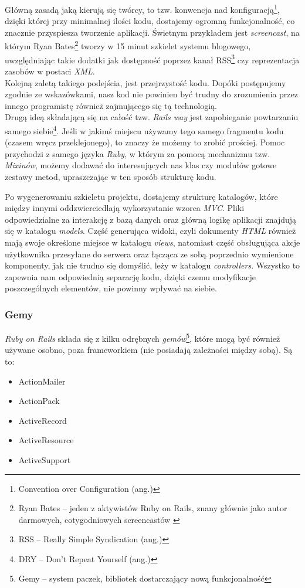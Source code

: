 \documentclass[a4paper,12pt]{article}
\begin{document}
Główną zasadą jaką kierują się twórcy, to tzw. konwencja nad
konfiguracją\footnote{Convention over Configuration (ang.)}, dzięki której przy minimalnej
ilości kodu, dostajemy ogromną funkcjonalność, co znacznie przyspiesza tworzenie
aplikacji. Świetnym przykładem jest \emph{screencast}, na którym Ryan
Bates\footnote{Ryan Bates -- jeden z aktywistów Ruby on Rails, znany głównie jako autor
darmowych, cotygodniowych screencastów \cite{ryan-bates}} tworzy w 15 minut szkielet
systemu blogowego, uwzględniając takie dodatki jak dostępność poprzez kanał
RSS\footnote{RSS -- Really Simple Syndication (ang.)} czy reprezentacja zasobów w postaci
\emph{XML}.\cite{blog-in-15-min}\\
Kolejną zaletą takiego podejścia, jest przejrzystość kodu. Dopóki postępujemy zgodnie ze
wskazówkami, nasz kod nie powinien być trudny do zrozumienia przez innego programistę
również zajmującego się tą technologią.\\
Drugą ideą składającą się na całość tzw. \emph{Rails way} jest zapobieganie powtarzaniu
samego siebie\footnote{DRY -- Don't Repeat Yourself (ang.)}. Jeśli w jakimś miejscu używamy
tego samego fragmentu kodu (czasem wręcz przeklejonego), to znaczy że możemy to zrobić
prościej. Pomoc przychodzi z samego języka \emph{Ruby}, w którym za pomocą mechanizmu
tzw. \emph{Mixinów}, możemy dodawać do interesujących nas klas czy modułów gotowe zestawy
metod, upraszczając w ten sposób strukturę kodu.


Po wygenerowaniu szkieletu projektu, dostajemy strukturę katalogów, które między innymi
oddzwierciedlają wykorzystanie wzorca \emph{MVC}. Pliki odpowiedzialne za interakcję z
bazą danych oraz główną logikę aplikacji znajdują się w katalogu \emph{models}. Część
generująca widoki, czyli dokumenty \emph{HTML} również mają swoje określone miejsce w
katalogu \emph{views}, natomiast część obsługująca akcje użytkownika przesyłane do serwera
oraz łącząca ze sobą poprzednio wymienione komponenty, jak nie trudno się domyślić, leży w
katalogu \emph{controllers}. Wszystko to zapewnia nam odpowiednią separację kodu, dzięki
czemu modyfikacje poszczególnych elementów, nie powinny wpływać na siebie.


\subsubsection{Gemy}
\emph{Ruby on Rails} składa się z kilku odrębnych \emph{gemów}\footnote{Gemy -- system
paczek, bibliotek dostarczający nową funkcjonalność}, które mogą być również używane
osobno, poza frameworkiem (nie posiadają zależności między sobą). Są to:
\begin{itemize}
  \item ActionMailer
  \item ActionPack
  \item ActiveRecord
  \item ActiveResource
  \item ActiveSupport
\end{itemize}
\end{document}
